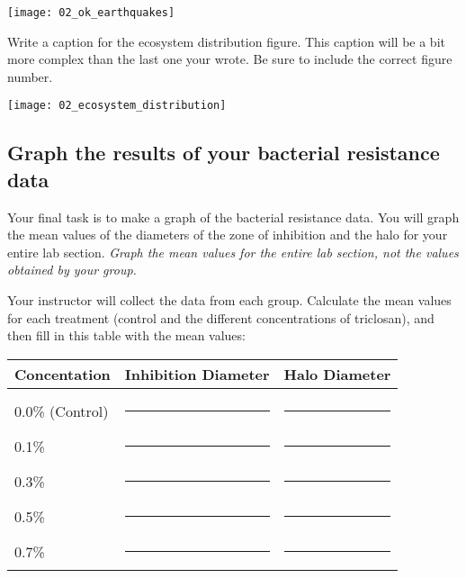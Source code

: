 \documentclass[12pt, hidelinks]{exam}
\begin{document}
\begin{questions}
\hfil%
\begin{minipage}{0.75\textwidth}
	\texttt{[image: 02\_ok\_earthquakes]}\\
	
	\vspace{0.15\textheight}
	
\end{minipage}%
\hfil

\question
Write a caption for the ecosystem distribution figure. This
caption will be a bit more complex than the last one your wrote.
Be sure to include  the correct figure number.

\hfil%
\begin{minipage}{0.75\textwidth}
	\texttt{[image: 02\_ecosystem\_distribution]}\\
	
	\vspace{6\baselineskip}
	
\end{minipage}%
\hfil



\subsection*{Graph the results of your bacterial resistance data}

Your final task is to make a graph of the bacterial resistance data. 
You will graph the mean values of the diameters of the zone of inhibition 
and the halo for your entire lab section. \emph{Graph the mean values for 
the entire lab section, not the values obtained by your group.} 

Your instructor will collect the data from each group. Calculate the mean 
values for each treatment (control and the different concentrations of 
triclosan), and then fill in this table with the mean values:

\begin{longtable}[c]{lcc}
	\toprule
	Concentation	&	Inhibition Diameter	&	Halo Diameter \tabularnewline
	\midrule
	& & \tabularnewline[0.5em]
	0.0\% (Control)	& \rule{0.75in}{0.4pt} & \rule{0.75in}{0.4pt} \tabularnewline[1.5em]
	0.1\%	& \rule{0.75in}{0.4pt} & \rule{0.75in}{0.4pt} \tabularnewline[1.5em]
	0.3\%	& \rule{0.75in}{0.4pt} & \rule{0.75in}{0.4pt} \tabularnewline[1.5em]
	0.5\%	& \rule{0.75in}{0.4pt} & \rule{0.75in}{0.4pt} \tabularnewline[1.5em]
	0.7\%	& \rule{0.75in}{0.4pt} & \rule{0.75in}{0.4pt} \tabularnewline
	\bottomrule
\end{longtable}


\end{questions}
\end{document}
